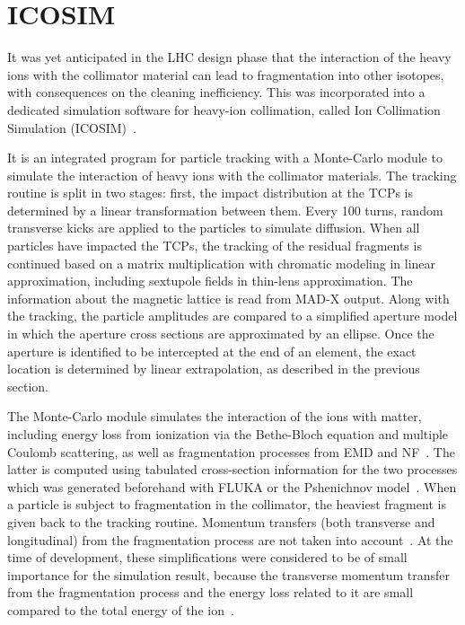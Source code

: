 \section{ICOSIM}

It was yet anticipated in the LHC design phase that the interaction of the heavy ions with the collimator material can lead to fragmentation into other isotopes, with consequences on the cleaning inefficiency. This was incorporated into a dedicated simulation software for heavy-ion collimation, called Ion Collimation Simulation (ICOSIM)~\cite{ICOSIMref02,ICOSIMref01}. 
\vspace{0.2cm}

It is an integrated program for particle tracking with a Monte-Carlo module to simulate the interaction of heavy ions with the collimator materials. The tracking routine is split in two stages: first, the impact distribution at the TCPs is determined by a linear transformation between them. Every 100 turns, random transverse kicks are applied to the particles to simulate diffusion. When all particles have impacted the TCPs, the tracking of the residual fragments is continued based on a matrix multiplication with chromatic modeling in linear approximation, including sextupole fields in thin-lens approximation. The information about the magnetic lattice is read from MAD-X output. Along with the tracking, the particle amplitudes are compared to a simplified aperture model in which the aperture cross sections are approximated by an ellipse. Once the aperture is identified to be intercepted at the end of an element, the exact location is determined by linear extrapolation, as described in the previous section. 
\vspace{0.2cm}

The Monte-Carlo module simulates the interaction of the ions with matter, including energy loss from ionization via the Bethe-Bloch equation and multiple Coulomb scattering, as well as fragmentation processes from EMD and NF~\cite{ICOSIMref02}. The latter is computed using tabulated cross-section information for the two processes which was generated beforehand with FLUKA or the Pshenichnov model~\cite{ICOSIMref02}. When a particle is subject to fragmentation in the collimator, the heaviest fragment is given back to the tracking routine. Momentum transfers (both transverse and longitudinal) from the fragmentation process are not taken into account~\cite{ICOSIMref02}. At the time of development, these simplifications were considered to be of small importance for the simulation result, because the transverse momentum transfer from the fragmentation process and the energy loss related to it are small compared to the total energy of the ion~\cite{ICOSIMref02}.



